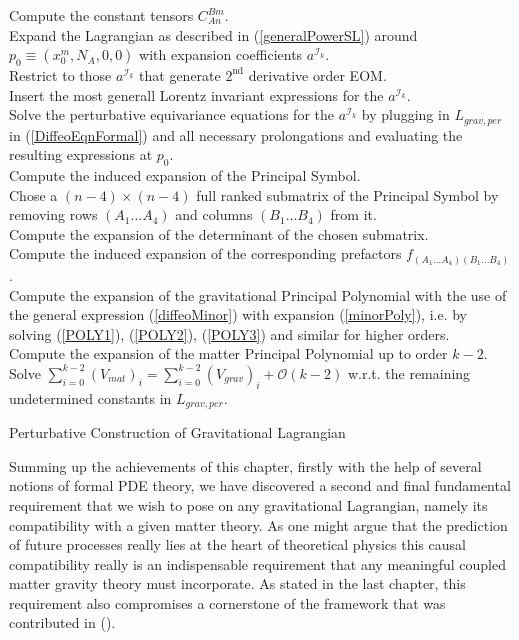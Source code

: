 \documentclass[a4paper,12pt, DIV=14, BCOR=5mm, twoside, headsepline, numbers=noenddot]{scrbook}
\begin{document}
\begin{algorithm}[hbt!]
\SetAlgoLined
{}
Compute the constant tensors $C^{Bm}_{An}$. \\
Expand the Lagrangian as described in (\ref{generalPowerSL}) around $p_0 \equiv (x_0^m,N_A,0,0)$ with expansion coefficients $a^{\mathcal{I}_k}$.\\
Restrict to those $a^{\mathcal{I}_k}$ that generate $2^{\text{nd}}$ derivative order EOM. \\
Insert the most generall Lorentz invariant expressions for the $a^{\mathcal{I}_k}$.\\
Solve the perturbative equivariance equations for the $a^{\mathcal{I}_k}$ by plugging in $L_{grav,per}$ in (\ref{DiffeoEqnFormal}) and all necessary prolongations and evaluating the resulting expressions at $p_0$.\\
Compute the induced expansion of the Principal Symbol.\\
Chose a $(n-4) \times (n-4)$ full ranked submatrix of the Principal Symbol by removing rows $(A_1...A_4)$ and columns $(B_1...B_4)$ from it. \\
Compute the expansion of the determinant of the chosen submatrix.\\
Compute the induced expansion of the corresponding prefactors $f_{(A_1...A_4)(B_1...B_4)}$. \\
Compute the expansion of the gravitational Principal Polynomial with the use of the general expression (\ref{diffeoMinor}) with expansion (\ref{minorPoly}), i.e. by solving (\ref{POLY1}), (\ref{POLY2}), (\ref{POLY3}) and similar for higher orders. \\
Compute the expansion of the matter Principal Polynomial up to order $k-2$.\\
Solve $\sum_{i=0}^{k-2} (V_{mat})_i = \sum _{i=0}^{k-2}(V_{grav})_i + \mathcal{O}(k-2)$ w.r.t. the remaining undetermined constants in $L_{grav,per}$.
 \caption{Perturbative Construction of Gravitational Lagrangian}\label{Algo2}
\end{algorithm}

Summing up the achievements of this chapter, firstly with the help of several notions of formal PDE theory, we have discovered a second and final fundamental requirement that we wish to pose on any gravitational Lagrangian, namely its compatibility with a given matter theory. As one might argue that the prediction of future processes really lies at the heart of theoretical physics this causal compatibility really is an indispensable requirement that any meaningful coupled matter gravity theory must incorporate. As stated in the last chapter, this requirement also compromises a cornerstone of the framework that was contributed in (\cite{2018PhRvD..97h4036D}). 
\end{document}
